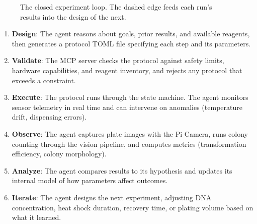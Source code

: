 \documentclass[11pt,letterpaper]{article}
\begin{document}
\begin{figure}[!htbp]
\centering
{}
\caption{The closed experiment loop. The dashed edge feeds each run's results into the design of the next.}
\label{fig:cycle}
\end{figure}

\begin{enumerate}
  \item \textbf{Design}: The agent reasons about goals, prior results, and available reagents, then generates a protocol TOML file specifying each step and its parameters.
  \item \textbf{Validate}: The MCP server checks the protocol against safety limits, hardware capabilities, and reagent inventory, and rejects any protocol that exceeds a constraint.
  \item \textbf{Execute}: The protocol runs through the state machine. The agent monitors sensor telemetry in real time and can intervene on anomalies (temperature drift, dispensing errors).
  \item \textbf{Observe}: The agent captures plate images with the Pi Camera, runs colony counting through the vision pipeline, and computes metrics (transformation efficiency, colony morphology).
  \item \textbf{Analyze}: The agent compares results to its hypothesis and updates its internal model of how parameters affect outcomes.
  \item \textbf{Iterate}: The agent designs the next experiment, adjusting DNA concentration, heat shock duration, recovery time, or plating volume based on what it learned.
\end{enumerate}
\end{document}
